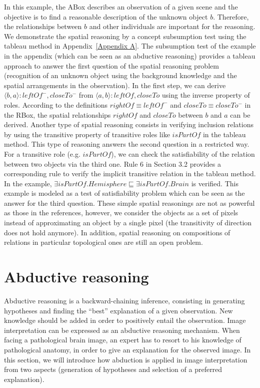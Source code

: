 \documentclass{article}
\begin{document}
In this example, the ABox describes an observation of a given scene and the objective is to find a reasonable description of  the unknown object $b$.
Therefore, the relationships between $b$ and other individuals are important for the reasoning. 
We demonstrate the spatial reasoning by a concept subsumption test using the tableau method in Appendix~\ref{Appendix A}.
The subsumption test of the example in the appendix (which can be seen as an abductive reasoning) provides a tableau approach to answer the first question of the spatial reasoning
problem (recognition of an unknown object using the background knowledge and the spatial arrangements in the observation).
In the first step, we can derive $\langle b,a\rangle:leftOf^-,closeTo^-$ from $\langle a,b\rangle:leftOf,closeTo$ using the inverse property of roles.
According to the definitions $rightOf\equiv leftOf^-$ and $closeTo\equiv closeTo^-$ in the RBox, the spatial relationships $rightOf$ and $closeTo$ between $b$ and $a$ can be derived.
Another type of spatial reasoning consists in verifying inclusion relations by using the transitive property of transitive roles like $isPartOf$ in the tableau method. 
This type of reasoning answers the second question in a restricted way. For a transitive role (e.g. $isPartOf$), we can check the satisfiability of the relation
between two objects via the third one. Rule 6 in Section 3.2 provides a corresponding rule to verify the implicit transitive relation in the tableau method. 
In the example, $\exists isPartOf. Hemisphere \sqsubseteq \exists isPartOf.Brain$ is verified.
This example is modeled as a test of satisfiability problem which can be seen as the answer for the third question.
These simple spatial reasonings are not as powerful as those in the references, however, we consider the objects as a set of pixels instead of approximating an object by a single pixel 
(the transitivity of direction does not hold anymore).
In addition, spatial reasoning on compositions of relations in particular topological ones are still an open problem.

\section{Abductive reasoning}\label{sec:abd}
Abductive reasoning is a backward-chaining inference, consisting in generating hypotheses and finding the ``best'' explanation of a given observation.
New knowledge should be added in order to positively entail the observation.
Image interpretation can be expressed as an abductive reasoning  mechanism.
When facing a pathological brain image, an expert has to resort to his knowledge of pathological anatomy, in order to give  an explanation for the observed image. 
In this section, we will introduce how abduction is applied in image interpretation from two aspects (generation of hypotheses and selection of a preferred explanation).
\end{document}
